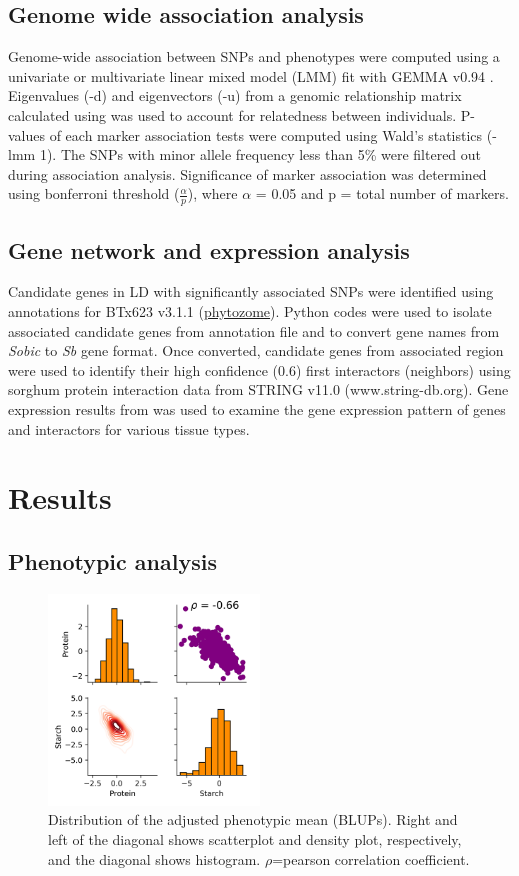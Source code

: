 \documentclass[10pt,letterpaper]{article}
\begin{document}
\subsection*{Genome wide association analysis}
Genome-wide association between SNPs and phenotypes were computed using a univariate or multivariate linear mixed model (LMM) fit with GEMMA v0.94 \parencite{zhou2012genome,zhou2014efficient}. Eigenvalues (-d) and eigenvectors (-u) from a genomic relationship matrix calculated using \parencite{vanraden2008efficient} was used to account for relatedness between individuals. P-values of each marker association tests were computed using Wald's statistics (-lmm 1). The SNPs with minor allele frequency less than 5\% were filtered out during association analysis. Significance of marker association was determined using bonferroni threshold ($\frac{\alpha}{p}$), where $\alpha$ = 0.05 and p = total number of markers.

\subsection*{Gene network and expression analysis}
Candidate genes in LD with significantly associated SNPs were identified using annotations for BTx623 v3.1.1 (\href{www.phytozome.net}{phytozome}). Python codes were used to isolate associated candidate genes from annotation file and to convert gene names from \textit{Sobic} to \textit{Sb} gene format. Once converted, candidate genes from associated region were used to identify their high confidence (0.6) first interactors (neighbors) using sorghum protein interaction data from STRING v11.0 (www.string-db.org). Gene expression results from \citet{olson2014expanding} was used to examine the gene expression pattern of genes and interactors for various tissue types.

\section*{Results}
\subsection*{Phenotypic analysis}

\begin{figure}
    \includegraphics[width=0.5\textwidth]{Figure1}
    \caption{Distribution of the adjusted phenotypic mean (BLUPs). Right and left of the diagonal shows scatterplot and density plot, respectively, and the diagonal shows histogram. $\rho$=pearson correlation coefficient.}
    \label{fig1}
\end{figure}
\end{document}
